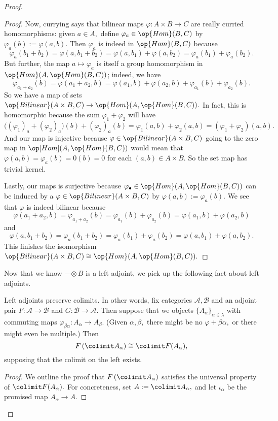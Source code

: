 \begin{proof}
\begin{proof}
		Now, currying says that bilinear maps $\varphi:A\times B\to C$ are really curried homomorphisms: given $a\in A,$ define $\varphi_a\in\op{Hom}(B,C)$ by $\varphi_a(b):=\varphi(a,b).$ Then $\varphi_a$ is indeed in $\op{Hom}(B,C)$ because
		\[\varphi_a(b_1+b_2)=\varphi(a,b_1+b_2)=\varphi(a,b_1)+\varphi(a,b_2)=\varphi_a(b_1)+\varphi_a(b_2).\]
		But further, the map $a\mapsto\varphi_a$ is itself a group homomorphism in $\op{Hom}(A,\op{Hom}(B,C))$; indeed, we have
		\[\varphi_{a_1+a_2}(b)=\varphi(a_1+a_2,b)=\varphi(a_1,b)+\varphi(a_2,b)+\varphi_{a_1}(b)+\varphi_{a_2}(b).\]
		So we have a map of sets $\op{Bilinear}(A\times B,C)\to\op{Hom}(A,\op{Hom}(B,C)).$ In fact, this is homomorphic because the sum $\varphi_1+\varphi_2$ will have
		\[\big((\varphi_1)_a+(\varphi_2)_a\big)(b)+(\varphi_2)_a(b)=\varphi_1(a,b)+\varphi_2(a,b)=(\varphi_1+\varphi_2)(a,b).\]
		And our map is injective because $\varphi\in\op{Bilinear}(A\times B,C)$ going to the zero map in $\op[Hom](A,\op{Hom}(B,C))$ would mean that $\varphi(a,b)=\varphi_a(b)=0(b)=0$ for each $(a,b)\in A\times B.$ So the set map has trivial kernel.

		Lastly, our maps is surjective because $\varphi_\bullet\in\op{Hom}(A,\op{Hom}(B,C))$ can be induced by a $\varphi\in\op{Bilinear}(A\times B,C)$ by $\varphi(a,b):=\varphi_a(b).$ We see that $\varphi$ is indeed bilinear because
		\[\varphi(a_1+a_2,b)=\varphi_{a_1+a_2}(b)=\varphi_{a_1}(b)+\varphi_{a_2}(b)=\varphi(a_1,b)+\varphi(a_2,b)\]
		and
		\[\varphi(a,b_1+b_2)=\varphi_a(b_1+b_2)=\varphi_a(b_1)+\varphi_a(b_2)=\varphi(a,b_1)+\varphi(a,b_2).\]
		This finishes the isomorphism $\op{Bilinear}(A\times B,C)\cong\op{Hom}(A,\op{Hom}(B,C)).$
	\end{proof}
	Now that we know $-\otimes B$ is a left adjoint, we pick up the following fact about left adjoints.
	\begin{lemma} \label{lem:leftcolimit}
		Left adjoints preserve colimits. In other words, fix categories $\mathcal A,\mathcal B$ and an adjoint pair $F:\mathcal A\to\mathcal B$ and $G:\mathcal B\to\mathcal A.$ Then suppose that we objects $\{A_\alpha\}_{\alpha\in\lambda}$ with commuting maps $\varphi_{\beta\alpha}:A_\alpha\to A_\beta.$ (Given $\alpha,\beta,$ there might be no $\varphi+{\beta\alpha},$ or there might even be multiple.) Then
		\[F\left(\colimit A_\alpha\right)\cong\colimit F(A_\alpha),\]
		supposing that the colimit on the left exists.
	\end{lemma}
	\begin{proof}
		We outline the proof that $F\left(\colimit A_\alpha\right)$ satisfies the universal property of $\colimit F(A_\alpha).$ For concreteness, set $A:=\colimit A_\alpha,$ and let $\iota_\alpha$ be the promised map $A_\alpha\to A.$
		

\end{proof}
\end{proof}
